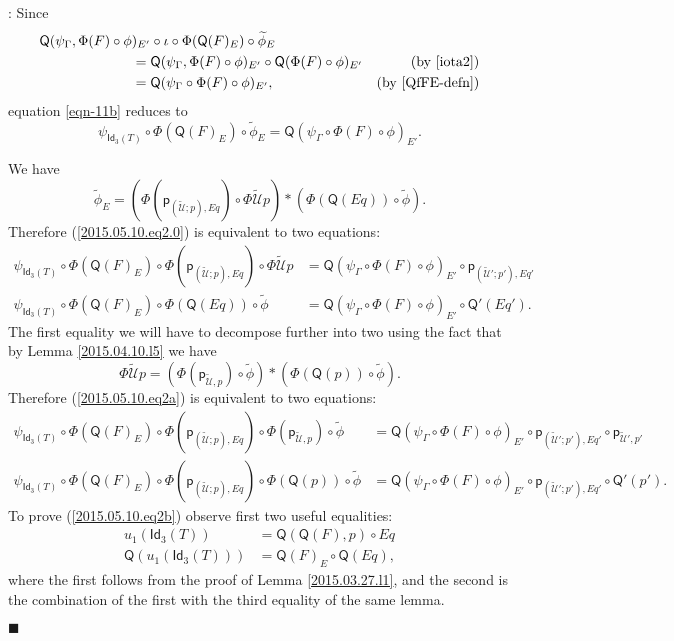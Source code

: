\documentclass[12pt]{article}
\numberwithin{equation}{section}
\newenvironment{eq}{\begin{equation}}{\end{equation}}
\newenvironment{myproof}{{\bf Proof}:}{$\blacksquare$ \vskip 5mm }
\newcommand{\by}[1]{\text{(by #1)}}
\newcommand{\wt}{\widetilde}
\newcommand{\p}{\mathsf{p}}
\newcommand{\Idx}{\mathsf{Id}_3} %
\newcommand{\U}{\mathcal{U}}
\newcommand{\Q}{\mathsf{Q}}
\begin{document}
\begin{myproof}
Since
%
\begin{align*}
        \Q(\psi_{\Gamma},\Phi(F)\circ\phi&)_{E'}\circ \iota\circ \Phi(\Q(F)_E)\circ \wt{\phi}_E \\
    & = \Q(\psi_{\Gamma},\Phi(F) \circ\phi)_{E'}\circ \Q(\Phi(F)\circ\phi)_{E'}                 & \by{\ref{iota2}} \\
    & = \Q(\psi_{\Gamma}\circ \Phi(F)\circ \phi)_{E'},                                           & \by{\ref{QfFE-defn}}
\end{align*}
%
equation \ref{eqn-11b} reduces to
%
\begin{eq}
  \label{2015.05.10.eq2.0}
  \psi_{\Idx(T)}\circ \Phi(\Q(F)_E)\circ \wt{\phi}_E = \Q(\psi_{\Gamma}\circ \Phi(F)\circ \phi)_{E'}.
\end{eq}%
%

We have
%
$$\wt{\phi}_E=(\Phi(\p_{(\wt{\U};p),Eq})\circ
\Phi\wt{\U}p)*(\Phi(\Q(Eq))\circ\wt{\phi}).$$
%
Therefore (\ref{2015.05.10.eq2.0}) is equivalent to two equations:
%
\begin{align}
  \psi_{\Idx(T)}\circ \Phi(\Q(F)_E)\circ \Phi(\p_{(\wt{\U};p),Eq})\circ \Phi\wt{\U}p
  & = \Q(\psi_{\Gamma}\circ \Phi(F)\circ \phi)_{E'}\circ \p_{(\wt{\U}';p'),Eq'} \label{2015.05.10.eq2a} \\
  \psi_{\Idx(T)}\circ \Phi(\Q(F)_E)\circ \Phi(\Q(Eq))\circ\wt{\phi}
  & = \Q(\psi_{\Gamma}\circ \Phi(F)\circ \phi)_{E'}\circ \Q'(Eq'). \label{2015.05.10.eq2b}
\end{align}
%
The first equality we will have to decompose further into two using the fact
that by Lemma \ref{2015.04.10.l5} we have
%
$$\Phi\wt{\U}p=(\Phi(\p_{\wt{\U},p})\circ\wt{\phi})*(\Phi(\Q(p))\circ \wt{\phi}).$$
%
Therefore (\ref{2015.05.10.eq2a}) is equivalent to two equations:
%
\begin{align}
  \psi_{\Idx(T)}\circ \Phi(\Q(F)_E)\circ \Phi(\p_{(\wt{\U};p),Eq})\circ \Phi(\p_{\wt{\U},p})\circ\wt{\phi}
  & = \Q(\psi_{\Gamma}\circ \Phi(F)\circ \phi)_{E'}\circ \p_{(\wt{\U}';p'),Eq'}\circ \p_{\wt{\U}',p'} \label{2015.05.10.eq2aa} \\
  \psi_{\Idx(T)}\circ \Phi(\Q(F)_E)\circ \Phi(\p_{(\wt{\U};p),Eq})\circ \Phi(\Q(p))\circ\wt{\phi}
  & = \Q(\psi_{\Gamma}\circ \Phi(F)\circ \phi)_{E'}\circ \p_{(\wt{\U}';p'),Eq'}\circ \Q'(p'). \label{2015.05.10.eq2ab}
\end{align}
%
To prove (\ref{2015.05.10.eq2b}) observe first two useful equalities:
%
\begin{align}
  u_1(\Idx(T))&=\Q(\Q(F),p)\circ Eq \label{usefulequal1} \\
  \Q(u_1(\Idx(T)))&=\Q(F)_{E}\circ \Q(Eq), \label{usefulequal2}
\end{align}
%
where the first follows from the proof of Lemma \ref{2015.03.27.l1}, and the
second is the combination of the first with the third equality of the same
lemma.


\end{myproof}
\end{document}
